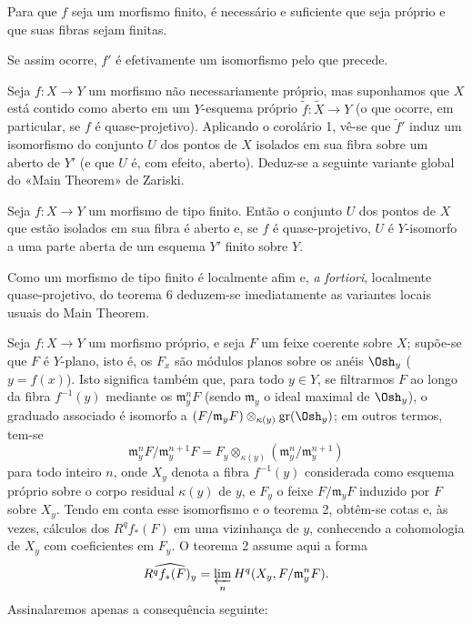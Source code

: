  Para que $f$ seja um morfismo finito, é necessário e
suficiente que seja próprio e que suas fibras sejam finitas.

Se assim ocorre, $f'$ é efetivamente um isomorfismo pelo que precede.

Seja $f:X\longrightarrow Y$ um morfismo não necessariamente próprio, mas
suponhamos que $X$ está contido como aberto em um $Y$-esquema próprio
$\widetilde f:\widetilde X\longrightarrow Y$ (o que ocorre, em particular,
se $f$ é quase-projetivo). Aplicando o corolário 1, vê-se que $\widetilde f'$
induz um isomorfismo do conjunto $U$ dos pontos de $X$ isolados em sua fibra
sobre um aberto de $Y'$ (e que $U$ é, com efeito, aberto). Deduz-se a
seguinte variante global do «Main Theorem» de Zariski.

 Seja
$f:X\longrightarrow Y$ um morfismo de tipo finito. Então o conjunto $U$ dos
pontos de $X$ que estão isolados em sua fibra é aberto e, se $f$ é
quase-projetivo, $U$ é
$Y$-isomorfo a uma parte aberta de um esquema $Y'$ finito sobre $Y$.

Como um morfismo de tipo finito é localmente afim e, \textit{a fortiori},
localmente quase-projetivo, do teorema 6 deduzem-se imediatamente as variantes
locais usuais do Main Theorem.


Seja $f:X\longrightarrow Y$ um morfismo próprio, e seja $F$ um feixe coerente sobre
$X$; supõe-se que $F$ é $Y$-plano, isto é, os $F_x$ são módulos planos sobre os
anéis $\Osh_y$ ($y=f(x)$). Isto significa também que, para todo $y\in Y$, se
filtrarmos $F$ ao longo da fibra $f^{-1}(y)$ mediante os
$\mathfrak m_y^nF$ (sendo $\mathfrak m_y$ o ideal maximal de $\Osh_y$), o
graduado associado é isomorfo a
$(F/\mathfrak m_yF)\otimes_{\kappa(y)}\operatorname{gr}(\Osh_y)$; em outros
termos, tem-se
\[
  \mathfrak m_y^nF/\mathfrak m_y^{n+1}F
  =F_y\otimes_{\kappa(y)}
  (\mathfrak m_y^n/\mathfrak m_y^{n+1})
\]
para todo inteiro $n$, onde $X_y$ denota a fibra $f^{-1}(y)$ considerada como
esquema próprio sobre o corpo residual $\kappa(y)$ de $y$, e $F_y$ o feixe
$F/\mathfrak m_yF$ induzido por $F$ sobre $X_y$. Tendo em conta esse
isomorfismo e o teorema 2, obtêm-se cotas e, às vezes, cálculos dos
$R^qf_*(F)$ em uma vizinhança de $y$, conhecendo a cohomologia de $X_y$ com
coeficientes em $F_y$. O teorema 2 assume aqui a forma
\[
  \widehat{R^qf_*(F)_y}
  =\varprojlim_n H^q(X_y,F/\mathfrak m_y^nF).
\]
Assinalaremos apenas a consequência seguinte:

